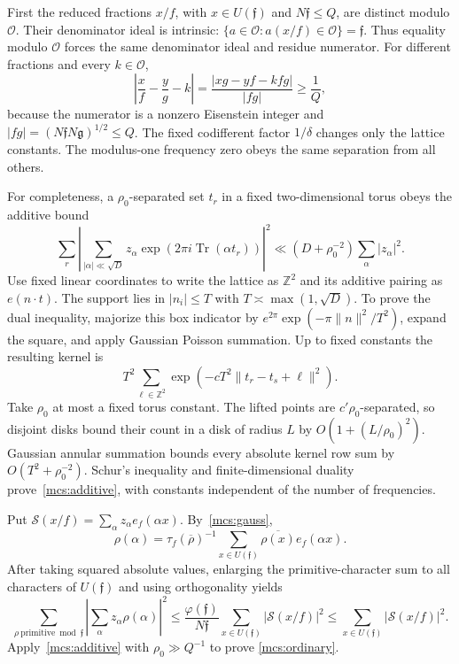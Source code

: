 \documentclass[11pt]{article}
\theoremstyle{definition}\newtheorem{definition}[theorem]{Definition}
\theoremstyle{remark}\newtheorem{remark}[theorem]{Remark}
\begin{document}
First the reduced fractions $x/f$, with $x\in U(\mathfrak f)$ and
$N\mathfrak f\le Q$, are distinct modulo $\mathcal O$.
Their denominator ideal is intrinsic:
$\{a\in\mathcal O:a(x/f)\in\mathcal O\}=\mathfrak f$.
Thus equality modulo $\mathcal O$ forces the same denominator ideal
and residue numerator. For different fractions and every $k\in\mathcal O$,
\[
 \left|\frac{x}{f}-\frac{y}{g}-k\right|
   =\frac{|xg-yf-kfg|}{|fg|}\ge\frac1Q,
\]
because the numerator is a nonzero Eisenstein integer and
$|fg|=(N\mathfrak f N\mathfrak g)^{1/2}\le Q$.
The fixed codifferent factor $1/\delta$ changes only the lattice constants.
The modulus-one frequency zero obeys the same separation from all others.

For completeness, a $\rho_0$-separated set $t_r$ in a fixed
two-dimensional torus obeys the additive bound
\begin{equation}\label{mcs:additive}
 \sum_r\left|\sum_{|\alpha|\ll\sqrt D}
        z_\alpha\exp(2\pi i\operatorname{Tr}(\alpha t_r))\right|^2
       \ll(D+\rho_0^{-2})\sum_\alpha|z_\alpha|^2.
\end{equation}
Use fixed linear coordinates to write the lattice as $\mathbb Z^2$ and
its additive pairing as $e(n\cdot t)$. The support lies in
$|n_i|\le T$ with $T\asymp\max(1,\sqrt D)$.
To prove the dual inequality, majorize this box indicator by
$e^{2\pi}\exp(-\pi\|n\|^2/T^2)$, expand the square, and apply Gaussian
Poisson summation. Up to fixed constants the resulting kernel is
\[
 T^2\sum_{\ell\in\mathbb Z^2}
       \exp(-cT^2\|t_r-t_s+\ell\|^2).
\]
Take $\rho_0$ at most a fixed torus constant. The lifted points are
$c'\rho_0$-separated, so disjoint disks bound their count in a disk
of radius $L$ by $O(1+(L/\rho_0)^2)$.
Gaussian annular summation bounds every absolute kernel row sum by
$O(T^2+\rho_0^{-2})$. Schur's inequality and finite-dimensional duality
prove~\eqref{mcs:additive}, with constants independent of the number
of frequencies.

Put $\mathcal S(x/f)=\sum_\alpha z_\alpha e_f(\alpha x)$.
By~\eqref{mcs:gauss},
\[
 \rho(\alpha)=\tau_f(\overline\rho)^{-1}
       \sum_{x\in U(\mathfrak f)}\overline{\rho(x)}e_f(\alpha x).
\]
After taking squared absolute values, enlarging the primitive-character
sum to all characters of $U(\mathfrak f)$ and using orthogonality yields
\[
 \sum_{\rho\ \mathrm{primitive}\bmod\mathfrak f}
       \left|\sum_\alpha z_\alpha\rho(\alpha)\right|^2
 \le\frac{\varphi(\mathfrak f)}{N\mathfrak f}
       \sum_{x\in U(\mathfrak f)}|\mathcal S(x/f)|^2
 \le\sum_{x\in U(\mathfrak f)}|\mathcal S(x/f)|^2.
\]
Apply~\eqref{mcs:additive} with $\rho_0\gg Q^{-1}$ to prove
\eqref{mcs:ordinary}.
\end{document}
